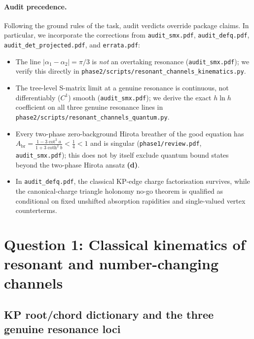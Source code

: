 \documentclass[11pt,a4paper]{article}
\newcommand{\Ld}{\textsf{\textbf{(d)}}\xspace}
\newcommand{\skin}{\texttt{phase2/\allowbreak scripts/\allowbreak resonant\_\allowbreak channels\_\allowbreak kinematics.py}}
\newcommand{\squant}{\texttt{phase2/\allowbreak scripts/\allowbreak resonant\_\allowbreak channels\_\allowbreak quantum.py}}
\theoremstyle{remark}
\begin{document}
\paragraph{Audit precedence.}
Following the ground rules of the task, audit verdicts override package claims.
In particular, we incorporate the corrections from \texttt{audit\_smx.pdf},
\texttt{audit\_defq.pdf}, \texttt{audit\_det\_projected.pdf}, and
\texttt{errata.pdf}:
\begin{itemize}
\item The line $|\alpha_1-\alpha_2|=\pi/3$ is \emph{not} an overtaking resonance
(\texttt{audit\_smx.pdf}); we verify this directly in \skin.
\item The tree-level S-matrix limit at a genuine resonance is continuous, not
differentiably ($C^1$) smooth (\texttt{audit\_smx.pdf}); we derive the exact
$h\ln h$ coefficient on all three genuine resonance lines in \squant.
\item Every two-phase zero-background Hirota breather of the good equation has
$A_{\mathrm{br}} = \frac{1-3\cot^2 a}{1+3\coth^2 b} < \frac{1}{4} < 1$ and is
singular (\texttt{phase1/\allowbreak review.pdf}, \texttt{audit\_smx.pdf}); this
does not by itself exclude quantum bound states beyond the two-phase Hirota
ansatz \Ld.
\item In \texttt{audit\_defq.pdf}, the classical KP-edge charge factorisation
survives, while the canonical-charge triangle holonomy no-go theorem is
qualified as conditional on fixed unshifted absorption rapidities and single-valued
vertex counterterms.
\end{itemize}

\section{Question 1: Classical kinematics of resonant and number-changing channels}
\label{sec:kinematics}

\subsection{KP root/chord dictionary and the three genuine resonance loci}
\end{document}
